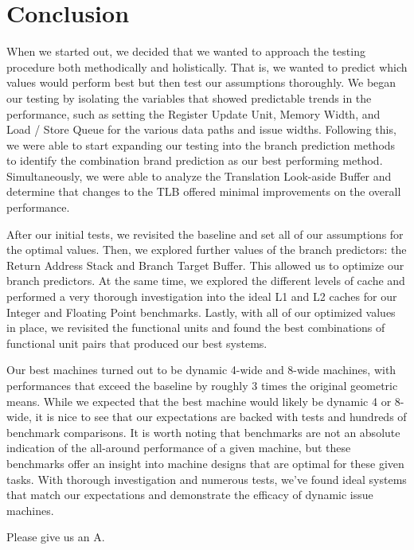 \documentclass[paper=a4, fontsize=12pt]{scrartcl} %
\numberwithin{equation}{section} %
\numberwithin{figure}{section} %
\numberwithin{table}{section} %
\begin{document}
\section{Conclusion}

When we started out, we decided that we wanted to approach the testing procedure both methodically and holistically. That is, we wanted to predict which values would perform best but then test our assumptions thoroughly. We began our testing by isolating the variables that showed predictable trends in the performance, such as setting the Register Update Unit, Memory Width, and Load / Store Queue for the various data paths and issue widths. Following this, we were able to start expanding our testing into the branch prediction methods to identify the combination brand prediction as our best performing method. Simultaneously, we were able to analyze the Translation Look-aside Buffer and determine that changes to the TLB offered minimal improvements on the overall performance.

After our initial tests, we revisited the baseline and set all of our assumptions for the optimal values. Then, we explored further values of the branch predictors: the Return Address Stack and Branch Target Buffer. This allowed us to optimize our branch predictors. At the same time, we explored the different levels of cache and performed a very thorough investigation into the ideal L1 and L2 caches for our Integer and Floating Point benchmarks. Lastly, with all of our optimized values in place, we revisited the functional units and found the best combinations of functional unit pairs that produced our best systems. 

Our best machines turned out to be dynamic 4-wide and 8-wide machines, with performances that exceed the baseline by roughly 3 times the original geometric means. While we expected that the best machine would likely be dynamic 4 or 8-wide, it is nice to see that our expectations are backed with tests and hundreds of benchmark comparisons. It is worth noting that benchmarks are not an absolute indication of the all-around performance of a given machine, but these benchmarks offer an insight into machine designs that are optimal for these given tasks. With thorough investigation and numerous tests, we've found ideal systems that match our expectations and demonstrate the efficacy of dynamic issue machines.

Please give us an A.
\end{document}
